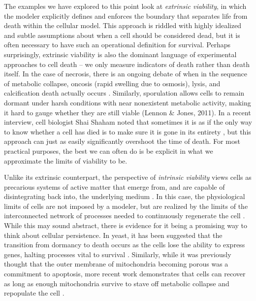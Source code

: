 \documentclass{article}
\begin{document}
The examples we have explored to this point look at \textit{extrinsic viability}, in which the modeler explicitly defines and enforces the boundary that separates life from death within the cellular model. This approach is riddled with highly idealized and subtle assumptions about when a cell should be considered dead, but it is often necessary to have such an operational definition for survival. Perhaps surprisingly, extrinsic viability is also the dominant language of experimental approaches to cell death – we only measure indicators of death rather than death itself. In the case of necrosis, there is an ongoing debate of when in the sequence of metabolic collapse, oncosis (rapid swelling due to osmosis), lysis, and calcification death actually occurs \cite{majno_apoptosis_1995,trump_pathways_1997,ghaffarizadeh_physicell_2018}. Similarly, sporulation allows cells to remain dormant under harsh conditions with near nonexistent metabolic activity, making it hard to gauge whether they are still viable (Lennon \& Jones, 2011). In a recent interview, cell biologist Shai Shaham noted that sometimes it is as if the only way to know whether a cell has died is to make sure it is gone in its entirety \cite{strogatz_how_2024}, but this approach can just as easily significantly overshoot the time of death. For most practical purposes, the best we can often do is be explicit in what we approximate the limits of viability to be.

Unlike its extrinsic counterpart, the perspective of \textit{intrinsic viability} views cells as precarious systems of active matter that emerge from, and are capable of disintegrating back into, the underlying medium \cite{shaebani_computational_2020,beer_theoretical_2023}. In this case, the physiological limits of cells are not imposed by a modeler, but are realized by the limits of the interconnected network of processes needed to continuously regenerate the cell \cite{maturana_autopoiesis_1980, varela_principles_2025}. While this may sound abstract, there is evidence for it being a promising way to think about cellular persistence. In yeast, it has been suggested that the transition from dormancy to death occurs as the cells lose the ability to express genes, halting processes vital to survival \cite{maire_dormancydeath_2020}. Similarly, while it was previously thought that the outer membrane of mitochondria becoming porous was a commitment to apoptosis, more recent work demonstrates that cells can recover as long as enough mitochondria survive to stave off metabolic collapse and repopulate the cell \cite{spencer_measuring_2011, bock_mitochondria_2020}. 
\end{document}
